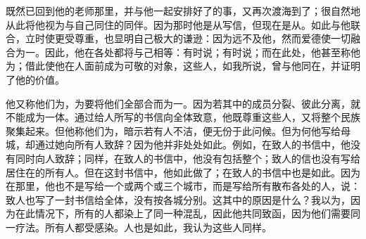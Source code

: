 既然已回到他的老师那里，并与他一起安排好了的事，又再次渡海到了；很自然地从此将他视为与自己同住的同伴。因为那时他是从写信，但现在是从。如此与他联合，立时使更受尊重，也显明自己极大的谦逊：因为远不及他，然而爱德使一切融合为一。因此，他在各处都将与己相等：有时说；有时说；而在此处，他甚至称他为；借此使他在人面前成为可敬的对象，这些人，如我所说，曾与他同在，并证明了他的价值。\par

他又称他们为，为要将他们全部合而为一。因为若其中的成员分裂、彼此分离，就不能成为一体。通过给人所写的书信向全体致意，他既尊重这些人，又将整个民族聚集起来。但他称他们为，暗示若有人不洁，便无份于此问候。但为何他写给母城，却通过她向所有人致辞？因为他并非处处如此。例如，在致人的书信中，他没有同时向人致辞；同样，在致人的书信中，他没有包括整个；致人的信也没有写给居住在的所有人。但在这封书信中，他如此做了；在致人的书信中也是如此。因为在那里，他也不是写给一个或两个或三个城市，而是写给所有散布各处的人，说：致人也写了一封书信给全体，没有按各城分别。这其中的原因是什么？我以为，因为在此情况下，所有的人都染上了同一种混乱，因此他共同致函，因为他们需要同一疗法。所有人都受感染。人也是如此，我认为这些人同样。\par

